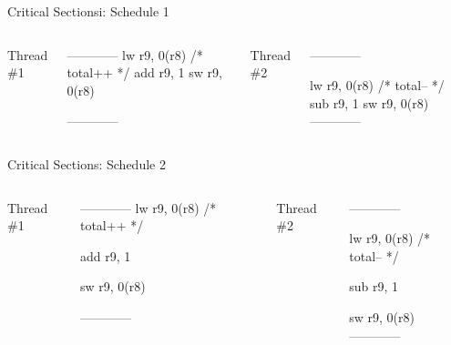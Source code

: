 \documentclass[11pt,aspectratio=169]{beamer}
\begin{document}
\begin{slide}{Critical Sectionsi: Schedule 1}
\begin{columns}
    Thread \#1\\
    \begin{ccode}
------------
lw r9, 0(r8) /* total++ */
add r9, 1
sw r9, 0(r8)



------------
    \end{ccode}
    Thread \#2\\
    \begin{ccode}
------------



lw r9, 0(r8) /* total-- */
sub r9, 1
sw r9, 0(r8)
------------
    \end{ccode}
\end{columns}
\end{slide}

\begin{slide}{Critical Sections: Schedule 2}
\begin{columns}
    Thread \#1\\
    \begin{ccode}
------------
lw r9, 0(r8) /* total++ */

add r9, 1

sw r9, 0(r8)

------------
    \end{ccode}
    Thread \#2\\
    \begin{ccode}
------------

lw r9, 0(r8) /* total-- */

sub r9, 1

sw r9, 0(r8)
------------
    \end{ccode}
\end{columns}
\end{slide}
\end{document}
